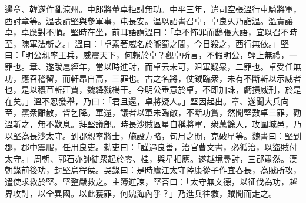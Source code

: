 \begin{pinyinscope}
邊章、韓遂作亂涼州。中郎將董卓拒討無功。中平三年，遣司空張溫行車騎將軍，西討章等。溫表請堅與參軍事，屯長安。溫以詔書召卓，卓良乆乃詣溫。溫責讓卓，卓應對不順。堅時在坐，前耳語謂溫曰：「卓不怖罪而鴟張大語，宜以召不時至，陳軍法斬之。」溫曰：「卓素著威名於隴蜀之間，今日殺之，西行無依。」堅曰：「明公親率王兵，威震天下，何賴於卓？觀卓所言，不假明公，輕上無禮，一罪也。章、遂跋扈經年，當以時進討，而卓云未可，沮軍疑衆，二罪也。卓受任無功，應召稽留，而軒昂自高，三罪也。古之名將，仗鉞臨衆，未有不斷斬以示威者也，是以穰苴斬莊賈，魏絳戮楊干。今明公垂意於卓，不即加誅，虧損威刑，於是在矣。」溫不忍發舉，乃曰：「君且還，卓將疑人。」堅因起出。章、遂聞大兵向至，黨衆離散，皆乞降。軍還，議者以軍未臨敵，不斷功賞，然聞堅數卓三罪，勸溫斬之，無不歎息。拜堅議郎。時長沙賊區星自稱將軍，衆萬餘人，攻圍城邑，乃以堅為長沙太守。到郡親率將士，施設方略，旬月之閒，克破星等。魏書曰：堅到郡，郡中震服，任用良吏。勑吏曰：「謹遇良善，治官曹文書，必循治，以盜賊付太守。」周朝、郭石亦帥徒衆起於零、桂，與星相應。遂越境尋討，三郡肅然。漢朝錄前後功，封堅烏程侯。吳錄曰：是時廬江太守陸康從子作宜春長，為賊所攻，遣使求救於堅。堅整嚴救之。主簿進諫，堅荅曰：「太守無文德，以征伐為功，越界攻討，以全異國。以此獲罪，何媿海內乎？」乃進兵往救，賊聞而走之。


\end{pinyinscope}

